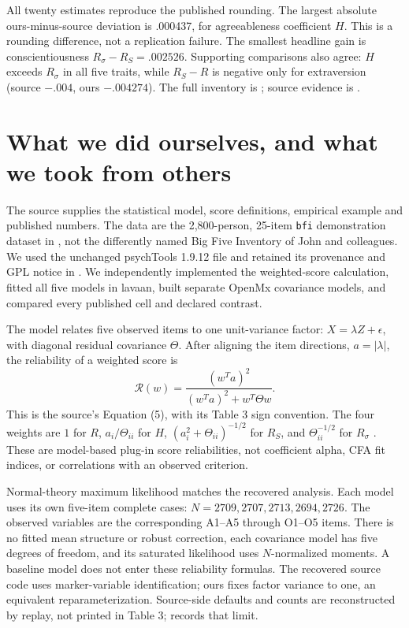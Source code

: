 All twenty estimates reproduce the published rounding. The largest absolute ours-minus-source deviation is .000437, for agreeableness coefficient $H$. This is a rounding difference, not a replication failure. The smallest headline gain is conscientiousness $R_\sigma-R_S=.002526$. Supporting comparisons also agree: $H$ exceeds $R_\sigma$ in all five traits, while $R_S-R$ is negative only for extraversion (source $-.004$, ours $-.004274$). The full inventory is ; source evidence is .

\section{What we did ourselves, and what we took from others}
The source supplies the statistical model, score definitions, empirical example and published numbers. The data are the 2,800-person, 25-item \texttt{bfi} demonstration dataset in \citet{revelle}, not the differently named Big Five Inventory of John and colleagues. We used the unchanged psychTools 1.9.12 file and retained its provenance and GPL notice in . We independently implemented the weighted-score calculation, fitted all five models in lavaan, built separate OpenMx covariance models, and compared every published cell and declared contrast.

The model relates five observed items to one unit-variance factor: $X=\lambda Z+\epsilon$, with diagonal residual covariance $\Theta$. After aligning the item directions, $a=|\lambda|$, the reliability of a weighted score is
\[
\mathcal R(w)=\frac{(w^T a)^2}{(w^T a)^2+w^T\Theta w}.
\]
This is the source's Equation (5), with its Table 3 sign convention. The four weights are $1$ for $R$, $a_i/\Theta_{ii}$ for $H$, $(a_i^2+\Theta_{ii})^{-1/2}$ for $R_S$, and $\Theta_{ii}^{-1/2}$ for $R_\sigma$ \citep[Paper I, Equations 7--9,18]{moss}. These are model-based plug-in score reliabilities, not coefficient alpha, CFA fit indices, or correlations with an observed criterion.

Normal-theory maximum likelihood matches the recovered analysis. Each model uses its own five-item complete cases: $N=2709,2707,2713,2694,2726$. The observed variables are the corresponding A1--A5 through O1--O5 items. There is no fitted mean structure or robust correction, each covariance model has five degrees of freedom, and its saturated likelihood uses $N$-normalized moments. A baseline model does not enter these reliability formulas. The recovered source code uses marker-variable identification; ours fixes factor variance to one, an equivalent reparameterization. Source-side defaults and counts are reconstructed by replay, not printed in Table 3;  records that limit.

